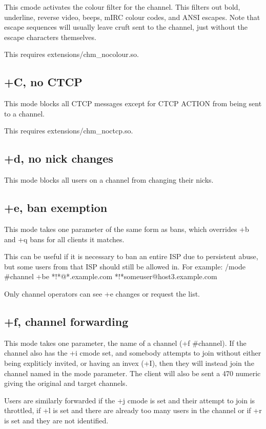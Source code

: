 	This cmode activates the colour filter for the channel. This filters
	out bold, underline, reverse video, beeps, mIRC colour codes, and ANSI
	escapes. Note that escape sequences will usually leave cruft sent to
	the channel, just without the escape characters themselves.

	This requires extensions/chm\_nocolour.so.


\subsection{+C, no CTCP}

	This mode blocks all CTCP messages except for CTCP ACTION from being
	sent to a channel.

	This requires extensions/chm\_noctcp.so.


\subsection{+d, no nick changes}

	This mode blocks all users on a channel from changing their nicks.


\subsection{+e, ban exemption}

	This mode takes one parameter of the same form as bans, which overrides
	+b and +q bans for all clients it matches.

	This can be useful if it is necessary to ban an entire ISP due to
	persistent abuse, but some users from that ISP should still be allowed
	in. For example: /mode \#channel +be *!*@*.example.com
	*!*someuser@host3.example.com

	Only channel operators can see +e changes or request the list.


\subsection{+f, channel forwarding}

	This mode takes one parameter, the name of a channel (+f \#channel). If
	the channel also has the +i cmode set, and somebody attempts to join
	without either being expliticly invited, or having an invex (+I), then
	they will instead join the channel named in the mode parameter. The
	client will also be sent a 470 numeric giving the original and target
	channels.

	Users are similarly forwarded if the +j cmode is set and their attempt
	to join is throttled, if +l is set and there are already too many users
	in the channel or if +r is set and they are not identified.

